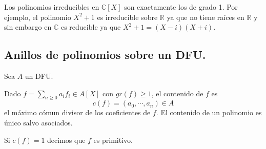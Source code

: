 \begin{example}
Los polinomios irreducibles en $\mathbb{C}[X]$ son exactamente los de grado 1. Por ejemplo, el polinomio $X^2+1$ es irreducible sobre $\mathbb{R}$ ya que no tiene raíces en $\mathbb{R}$ y sin embargo en $\mathbb{C}$ es reducible ya que $X^2+1 = (X-i)(X+i)$. 
\end{example}


\subsection{Anillos de polinomios sobre un DFU.}

\begin{definition}
Sea $A$ un DFU.

Dado $f = \sum_{n \ge 0} a_if_i \in A[X]$ con $gr(f) \ge 1$, el contenido de $f$ es $$c(f) = (a_0,\cdots,a_n) \in A$$ el máximo cómun divisor de los coeficientes de $f$. El contenido de un polinomio es único salvo asociados. 

Si $c(f) = 1$ decimos que $f$ es primitivo. 
\end{definition}

